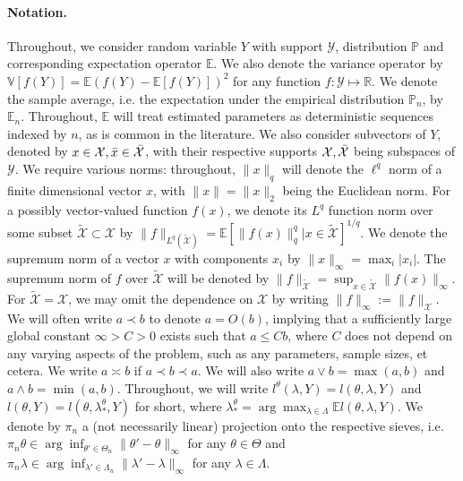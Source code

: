 \documentclass[12pt]{article}
\theoremstyle{myplain}
\theoremstyle{definition}
\theoremstyle{definition}
\theoremstyle{remark}
\numberwithin{equation}{section}
\begin{document}
\paragraph{Notation.}
Throughout, we consider random variable $Y$ with support $\mathcal{Y}$, distribution $\mathbb{P}$ and corresponding expectation operator $\mathbb{E}$. We also denote the variance operator by $\mathbb{V}[f(Y)]=\mathbb{E}(f(Y)-\mathbb{E}[f(Y)])^2$ for any function $f:\mathcal{Y}\mapsto\mathbb{R}$. We denote the sample average, i.e. the expectation under the empirical distribution $\mathbb{P}_n$, by $\mathbb{E}_n$. Throughout, $\mathbb{E}$ will treat estimated parameters as deterministic sequences indexed by $n$, as is common in the literature. We also consider subvectors of $Y$, denoted by $x\in {\mathcal{X}}, \Bar x\in \Bar {\mathcal{X}}$, with their respective supports ${\mathcal{X}}, \Bar {\mathcal{X}}$ being subspaces of $\mathcal{Y}$. We require various norms: throughout, $\|x\|_q$ will denote the $\ell^q$ norm of a finite dimensional vector $x$, with $\|x\|=\|x\|_2$ being the Euclidean norm. For a possibly vector-valued function $f(x)$, we denote its $L^q$ function norm over some subset $\widetilde{\mathcal{X}}\subset\mathcal{X}$ by $\|f\|_{L^q(\widetilde{\mathcal{X}})}=\mathbb{E}[\|f(x)\|^q_q|x\in \widetilde{\mathcal{X}}]^{1/q}$. We denote the supremum norm of a vector $x$ with components $x_i$ by $\|x\|_\infty=\max_i |x_i|$. The supremum norm of $f$ over $\widetilde{\mathcal{X}}$ will be denoted by $\|f\|_{\widetilde{\mathcal{X}}}=\sup_{x\in {\widetilde{\mathcal{X}}}} \|f(x)\|_\infty$. For $\widetilde{\mathcal{X}}=\mathcal{X}$, we may omit the dependence on ${\mathcal{X}}$ by writing $\|f\|_\infty:=\|f\|_{\mathcal{X}}$. We will often write $a\prec b$ to denote $a=O(b)$, implying that a sufficiently large global constant $\infty>C>0$ exists such that $a\leq C b$, where $C$ does not depend on any varying aspects of the problem, such as any parameters, sample sizes, et cetera. We write $a\asymp b$ if $a\prec b \prec a$. We will also write $a\vee b = \max(a, b)$ and $a \wedge b = \min(a,b)$. Throughout, we will write $l^\theta(\lambda, Y)=l(\theta, \lambda, Y)$ and $l(\theta, Y)=l(\theta, \lambda_*^\theta, Y)$ for short, where $\lambda_*^\theta=\arg\max_{\lambda\in\Lambda} \mathbb{E} l(\theta, \lambda, Y)$. We denote by $\pi_n$ a (not necessarily linear) projection onto the respective sieves, i.e. $\pi_n \theta\in\arg\inf_{\theta'\in\Theta_n} \|\theta'-\theta\|_\infty$ for any $\theta\in\Theta$ and $\pi_n \lambda\in\arg\inf_{\lambda'\in\Lambda_n} \|\lambda'-\lambda\|_\infty$ for any $\lambda\in\Lambda$.
\end{document}
